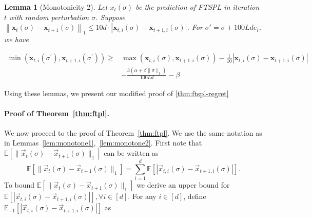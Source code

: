\documentclass[]{article}
\newcommand{\E}[1]{\mathbb{E}\left[#1\right]}
\newcommand{\Eover}[2]{\mathbb{E}_{#1}\left[#2\right]}
\newcommand{\x}{\vec{x}}
\newcommand{\norm}[1]{\|{#1} \|}
\newtheorem{lemma}{Lemma}[section]
\theoremstyle{definition}
\begin{document}
\begin{lemma}[Monotonicity 2]
    Let $x_t(\sigma)$ be the prediction of FTSPL in iteration $t$ with random perturbation $\sigma$. Suppose $\left\|\mathbf{x}_{t}(\sigma)-\mathbf{x}_{t+1}(\sigma)\right\|_{1} \leq 10 d \cdot\left|\mathbf{x}_{t, i}(\sigma)-\mathbf{x}_{t+1, i}(\sigma)\right|$. For $\sigma' = \sigma + 100Lde_i$, we have

\begin{align*} \min \left(\mathbf{x}_{t, i}\left(\sigma^{\prime}\right), \mathbf{x}_{t+1, i}\left(\sigma^{\prime}\right)\right) \geq & \max \left(\mathbf{x}_{t, i}(\sigma), \mathbf{x}_{t+1, i}(\sigma)\right)-\frac{1}{10}\left|\mathbf{x}_{t, i}(\sigma)-\mathbf{x}_{t+1, i}(\sigma)\right| \\ &-\frac{3\left(\alpha+\beta\|\sigma\|_{1}\right)}{100 L d}-\beta \end{align*}
\end{lemma}

Using these lemmas, we present our modified proof of \ref*{thm:ftspl-regret}

\paragraph{Proof of Theorem~\ref{thm:ftpl}.} We now proceed to the proof of Theorem~\ref{thm:ftpl}. We use the same notation as in Lemmas~\ref{lem:monotone1},~\ref{lem:monotone2}.
First note that $\E{\|\x_t(\sigma)-\x_{t+1}(\sigma)\|_1}$ can be written as
\begin{equation}
    \label{eqn:coordinatewise}
    \E{\norm{\x_t(\sigma)-\x_{t+1}(\sigma)}_1} = \sum_{i = 1}^d \E{|\x_{t,i}(\sigma)-\x_{t+1,i}(\sigma)|}.
\end{equation}
To bound $\E{\norm{\x_t(\sigma)-\x_{t+1}(\sigma)}_1}$ we derive an upper bound for \mbox{$\E{|\x_{t,i}(\sigma) - \x_{t+1,i}(\sigma)|}, \forall i\in [d]$}. For any $i \in [d]$, define $\Eover{-1}{|\x_{t,i}(\sigma) - \x_{t+1,i}(\sigma)|}$ as 
\end{document}
